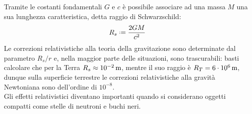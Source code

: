 Tramite le costanti fondamentali $ G $ e $ c $ è possibile associare ad una massa $ M $ una sua lunghezza caratteristica, detta raggio di Schwarzschild:
\begin{equation}
  R_s \defeq \frac{2GM}{c^2}
  \label{eq:0.3}
\end{equation}
Le correzioni relativistiche alla teoria della gravitazione sono determinate dal parametro $ R_s / r $ e, nella maggior parte delle situazioni, sono trascurabili: basti calcolare che per la Terra $ R_s \approx 10^{-2}\,\text{m} $, mentre il suo raggio è $ R_T = 6\cdot10^6\,\text{m} $, dunque sulla superficie terrestre le correzioni relativistiche alla gravità Newtoniana sono dell'ordine di $ 10^{-8} $.\\
Gli effetti relativistici diventano importanti quando si considerano oggetti compatti come stelle di neutroni e buchi neri.










